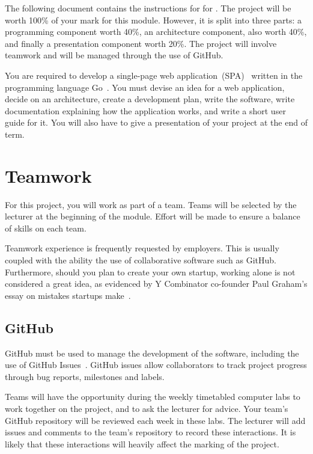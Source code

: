 \noindent
The following document contains the instructions for \projectname{} for \modulename{}.
The project will be worth 100\% of your mark for this module.
However, it is split into three parts: a programming component worth 40\%, an architecture component, also worth 40\%, and finally a presentation component worth 20\%.
The project will involve teamwork and will be managed through the use of GitHub.

You are required to develop a single-page web application (SPA)~\cite{gowebapp} written in the programming language Go~\cite{golang}.
You must devise an idea for a web application, decide on an architecture, create a development plan, write the software, write documentation explaining how the application works, and write a short user guide for it.
You will also have to give a presentation of your project at the end of term.

\section*{Teamwork}
For this project, you will work as part of a team.
Teams will be selected by the lecturer at the beginning of the module.
Effort will be made to ensure a balance of skills on each team.

Teamwork experience is frequently requested by employers.
This is usually coupled with the ability the use of collaborative software such as GitHub.
Furthermore, should you plan to create your own startup, working alone is not considered a great idea, as evidenced by Y Combinator co-founder Paul Graham's essay on mistakes startups make~\cite{paulgrahammistakes}.

\subsection*{GitHub}
GitHub must be used to manage the development of the software, including the use of GitHub Issues~\cite{githubissues}.
GitHub issues allow collaborators to track project progress through bug reports, milestones and labels.

Teams will have the opportunity during the weekly timetabled computer labs to work together on the project, and to ask the lecturer for advice.
Your team's GitHub repository will be reviewed each week in these labs.
The lecturer will add issues and comments to the team's repository to record these interactions.
It is likely that these interactions will heavily affect the marking of the project.

